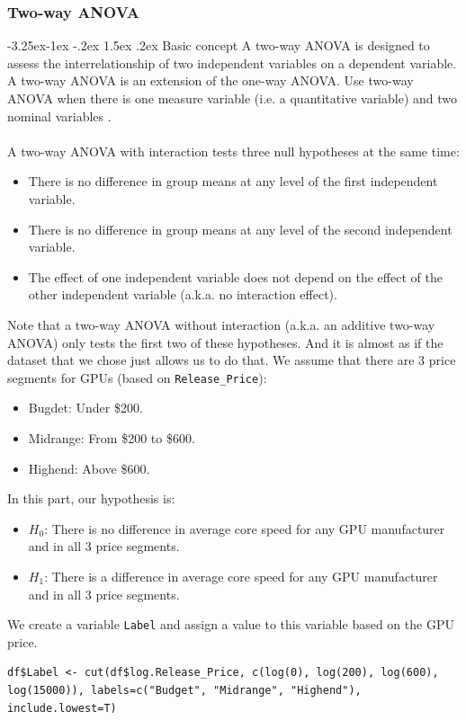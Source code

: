\documentclass[a4paper]{article}
\makeatletter
\newcounter {subsubsubsection}[subsubsection]
\newcommand\subsubsubsection{\@startsection{subsubsubsection}{4}{\z@}%
                                     {-3.25ex\@plus -1ex \@minus -.2ex}%
                                     {1.5ex \@plus .2ex}%
                                     {\normalfont\normalsize\bfseries}}
\makeatother
\begin{document}
\subsubsection{Two-way ANOVA}
\subsubsubsection{Basic concept}
A two-way ANOVA is designed to assess the interrelationship of two independent variables on a dependent variable. A two-way ANOVA is an extension of the one-way ANOVA. Use two-way ANOVA when there is one measure variable (i.e. a quantitative variable) and two nominal variables \cite{bib9}.\\\\
A two-way ANOVA with interaction tests three null hypotheses at the same time:
\begin{itemize}
    \item There is no difference in group means at any level of the first independent variable.
    \item There is no difference in group means at any level of the second independent variable.
    \item The effect of one independent variable does not depend on the effect of the other independent variable (a.k.a. no interaction effect).
\end{itemize}
Note that a two-way ANOVA without interaction (a.k.a. an additive two-way ANOVA) only tests the first two of these hypotheses. And it is almost as if the dataset that we chose just allows us to do that.
We assume that there are 3 price segments for GPUs (based on \verb|Release_Price|):
\begin{itemize}
    \item Bugdet: Under \$200.
    \item Midrange: From \$200 to \$600.
    \item Highend: Above \$600.
\end{itemize}
In this part, our hypothesis is:
\begin{itemize}
    \item $H_0$: There is no difference in average core speed for any GPU manufacturer and in all 3 price segments.
    \item $H_1$: There is a difference in average core speed for any GPU manufacturer and in all 3 price segments.
\end{itemize}
We create a variable \verb|Label| and assign a value to this variable based on the GPU price.
\begin{mdframed}[leftline=false,rightline=false,backgroundcolor=lightblue!10,nobreak=false]
    \begin{verbatim}
df$Label <- cut(df$log.Release_Price, c(log(0), log(200), log(600), log(15000)), labels=c("Budget", "Midrange", "Highend"), include.lowest=T)
    \end{verbatim}
\end{mdframed}
\end{document}
